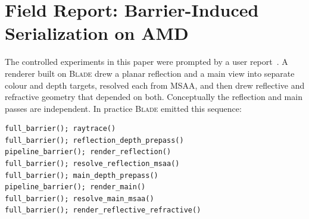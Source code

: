 \documentclass[10pt,twocolumn]{article}
\newcommand{\blade}{\textsc{Blade}}
\begin{document}
\section{Field Report: Barrier-Induced Serialization on AMD}
\label{sec:field}

The controlled experiments in this paper were prompted by a user
report~\cite{blade-issue-343}. A renderer built on \blade{} drew a planar
reflection and a main view into separate colour and depth targets, resolved
each from MSAA, and then drew reflective and refractive geometry that depended
on both. Conceptually the reflection and main passes are independent. In
practice \blade{} emitted this sequence:

\begin{verbatim}
full_barrier(); raytrace()
full_barrier(); reflection_depth_prepass()
pipeline_barrier(); render_reflection()
full_barrier(); resolve_reflection_msaa()
full_barrier(); main_depth_prepass()
pipeline_barrier(); render_main()
full_barrier(); resolve_main_msaa()
full_barrier(); render_reflective_refractive()
\end{verbatim}
\end{document}
